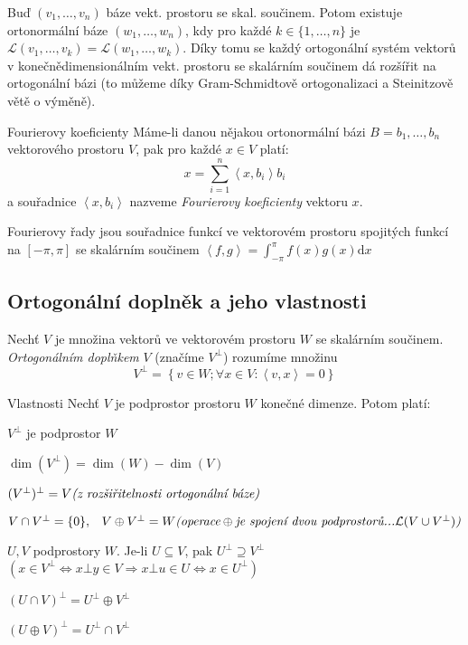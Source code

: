 \begin{dusledek}
Buď $(v_1,\dots,v_n)$ báze vekt. prostoru se skal. součinem. Potom existuje ortonormální báze $(w_1,\dots,w_n)$, kdy pro každé $k\in\{1,\dots,n\}$ je $\mathcal{L}(v_1,\dots,v_k)=\mathcal{L}(w_1,\dots,w_k)$. Díky tomu se každý ortogonální systém vektorů v konečnědimensionálním vekt. prostoru se skalárním součinem dá rozšířit na ortogonální bázi (to můžeme díky Gram-Schmidtově ortogonalizaci a Steinitzově větě o výměně).
\end{dusledek}

\begin{vetaN}{Fourierovy koeficienty}
Máme-li danou nějakou ortonormální bázi $B=b_1,\dots,b_n$ vektorového prostoru $V$, pak pro každé $x\in V$ platí:
$$x=\sum_{i=1}^n\left<x,b_i\right>b_i$$
a souřadnice $\left<x,b_i\right>$ nazveme \emph{Fourierovy koeficienty} vektoru $x$.
\end{vetaN}

\begin{poznamka}
Fourierovy řady jsou souřadnice funkcí ve vektorovém prostoru spojitých funkcí na $[-\pi,\pi]$ se skalárním součinem $\left<f,g\right>=\int_{-\pi}^{\pi}f(x)g(x)\mathrm{d}x$
\end{poznamka}


\subsection{Ortogonální doplněk a jeho vlastnosti}
\begin{definice}
Nechť $V$ je množina vektorů ve vektorovém prostoru $W$ se skalárním součinem. \emph{Ortogonálním doplňkem} $V$ (značíme $V^{\bot}$) rozumíme množinu
$$V^{\bot}=\left\{v \in W; \forall x \in V: \left<v,x\right> = 0 \right\}$$
\end{definice}

\begin{lemmaN}{Vlastnosti}
Nechť $V$ je podprostor prostoru $W$ konečné dimenze. Potom platí:
\begin{penumerate}
	\item $V^{\bot}$ je podprostor $W$
	\item $\dim(V^{\bot})=\dim(W)-\dim(V)$
	\item $(V^{\bot})^{\bot} = V \hfill \textit{(z rozšiřitelnosti ortogonální báze)}$ 
	\item $V \cap V^{\bot} = \{0\}, \;\;\; V \oplus V^{\bot} = W \\ \textit{(operace} \oplus \textit{je spojení dvou podprostorů...} \mathcal{L}(V \cup V^{\bot})\textit{)}$
	\item $U,V$ podprostory $W$. Je-li $U \subseteq V$, pak $U^{\bot} \supseteq V^{\bot}$\\
		$(x \in V^{\bot} \Leftrightarrow x \bot y \in V \Rightarrow x \bot u \in U \Leftrightarrow x \in U^{\bot})$
	\item $(U \cap V)^{\bot} = U^{\bot} \oplus V^{\bot}$
	\item $(U \oplus V)^{\bot} = U^{\bot} \cap V^{\bot}$
\end{penumerate}
\end{lemmaN}

